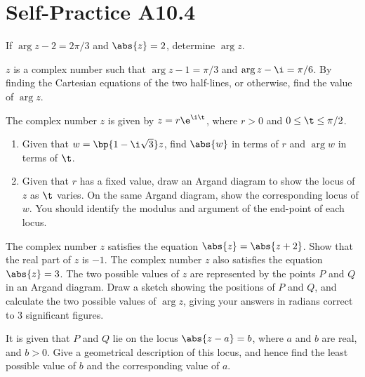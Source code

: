 \section{Self-Practice A10.4}

\begin{problem}
    If $\arg{z - 2} = 2\pi/3$ and $\abs{z} = 2$, determine $\arg{z}$.
\end{problem}

\begin{problem}
    $z$ is a complex number such that $\arg{z - 1} = \pi/3$ and $\arg{z - \i} = \pi/6$. By finding the Cartesian equations of the two half-lines, or otherwise, find the value of $\arg{z}$.
\end{problem}

\begin{problem}
    The complex number $z$ is given by $z = r\e^{\i \t}$, where $r > 0$ and $0 \leq \t \leq \pi/2$.

    \begin{enumerate}
        \item Given that $w = \bp{1 - \i \sqrt3}z$, find $\abs{w}$ in terms of $r$ and $\arg w$ in terms of $\t$.
        \item Given that $r$ has a fixed value, draw an Argand diagram to show the locus of $z$ as $\t$ varies. On the same Argand diagram, show the corresponding locus of $w$. You should identify the modulus and argument of the end-point of each locus.
    \end{enumerate}
\end{problem}

\begin{problem}
    The complex number $z$ satisfies the equation $\abs{z} = \abs{z + 2}$. Show that the real part of $z$ is $-1$. The complex number $z$ also satisfies the equation $\abs{z} = 3$. The two possible values of $z$ are represented by the points $P$ and $Q$ in an Argand diagram. Draw a sketch showing the positions of $P$ and $Q$, and calculate the two possible values of $\arg z$, giving your answers in radians correct to 3 significant figures.

    It is given that $P$ and $Q$ lie on the locus $\abs{z - a} = b$, where $a$ and $b$ are real, and $b > 0$. Give a geometrical description of this locus, and hence find the least possible value of $b$ and the corresponding value of $a$.
\end{problem}

